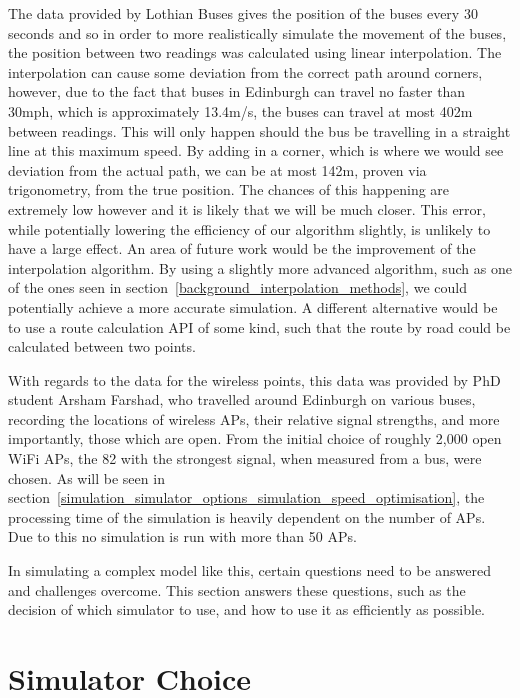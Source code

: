     The data provided by Lothian Buses gives the position of the buses every 30 seconds and so in order to more realistically simulate the movement of the buses, the position between two readings was calculated using linear interpolation. The interpolation can cause some deviation from the correct path around corners, however, due to the fact that buses in Edinburgh can travel no faster than 30mph, which is approximately 13.4m/s, the buses can travel at most 402m between readings. This will only happen should the bus be travelling in a straight line at this maximum speed. By adding in a corner, which is where we would see deviation from the actual path, we can be at most 142m, proven via trigonometry, from the true position. The chances of this happening are extremely low however and it is likely that we will be much closer. This error, while potentially lowering the efficiency of our algorithm slightly, is unlikely to have a large effect. An area of future work would be the improvement of the interpolation algorithm. By using a slightly more advanced algorithm, such as one of the ones seen in section~\ref{background_interpolation_methods}, we could potentially achieve a more accurate simulation. A different alternative would be to use a route calculation API of some kind, such that the route by road could be calculated between two points. 

    With regards to the data for the wireless points, this data was provided by PhD student Arsham Farshad, who travelled around Edinburgh on various buses, recording the locations of wireless APs, their relative signal strengths, and more importantly, those which are open. From the initial choice of roughly 2,000 open WiFi APs, the 82 with the strongest signal, when measured from a bus, were chosen. As will be seen in section~\ref{simulation_simulator_options_simulation_speed_optimisation}, the processing time of the simulation is heavily dependent on the number of APs. Due to this no simulation is run with more than 50 APs. 


    In simulating a complex model like this, certain questions need to be answered and challenges overcome. This section answers these questions, such as the decision of which simulator to use, and how to use it as efficiently as possible. 

    \section{Simulator Choice}\label{simulation_simulator_options_simulator_choice}

